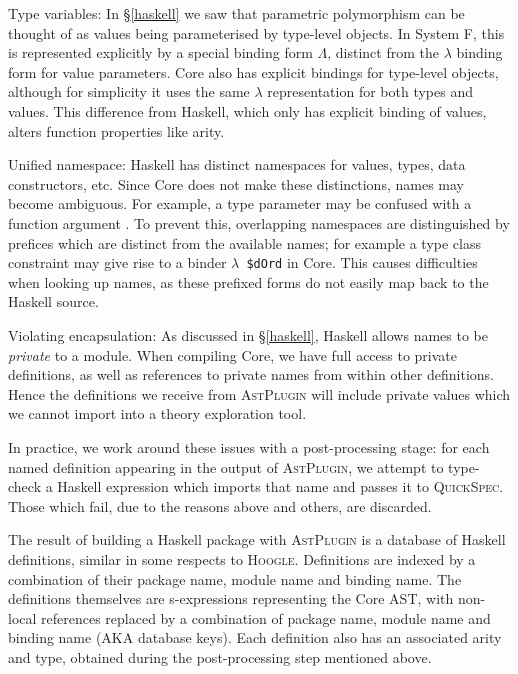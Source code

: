 \documentclass[]{article}
\begin{document}
\begin{description}
  \item{Type variables}: In \S \ref{haskell} we saw that parametric polymorphism can be thought of as values being parameterised by type-level objects. In System F, this is represented explicitly by a special binding form $\Lambda$, distinct from the $\lambda$ binding form for value parameters. Core also has explicit bindings for type-level objects, although for simplicity it uses the same $\lambda$ representation for both types and values. This difference from Haskell, which only has explicit binding of values, alters function properties like arity.

  \item{Unified namespace}: Haskell has distinct namespaces for values, types, data constructors, etc. Since Core does not make these distinctions, names may become ambiguous. For example, a type parameter  may be confused with a function argument . To prevent this, overlapping namespaces are distinguished by prefices which are distinct from the available names; for example a type class constraint  may give rise to a binder \texttt{$\lambda$ \$dOrd} in Core. This causes difficulties when looking up names, as these prefixed forms do not easily map back to the Haskell source.

  \item{Violating encapsulation}: As discussed in \S \ref{haskell}, Haskell allows names to be \emph{private} to a module. When compiling Core, we have full access to private definitions, as well as references to private names from within other definitions. Hence the definitions we receive from \textsc{AstPlugin} will include private values which we cannot import into a theory exploration tool.
\end{description}

In practice, we work around these issues with a post-processing stage: for each named definition appearing in the output of \textsc{AstPlugin}, we attempt to type-check a Haskell expression which imports that name and passes it to \textsc{QuickSpec}. Those which fail, due to the reasons above and others, are discarded.

The result of building a Haskell package with \textsc{AstPlugin} is a database of Haskell definitions, similar in some respects to \textsc{Hoogle}. Definitions are indexed by a combination of their package name, module name and binding name. The definitions themselves are s-expressions representing the Core AST, with non-local references replaced by a combination of package name, module name and binding name (AKA database keys). Each definition also has an associated arity and type, obtained during the post-processing step mentioned above.
\end{document}

